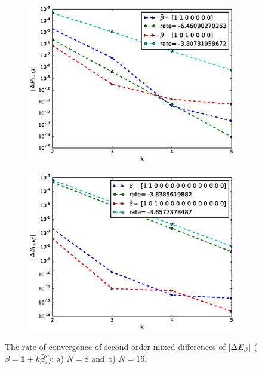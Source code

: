 \documentclass[11pt]{article}
\begin{document}
\begin{figure}[!h]
	\centering
	\begin{subfigure}{.5\textwidth}
		\centering
		\includegraphics[width=1\linewidth]{./figures/mixed_difference_order2_BS_richardson_4_8_no_midd_2le}
		\caption{}
		\label{fig:sub51_richardson}
	\end{subfigure}%
	\begin{subfigure}{.5\textwidth}
		\centering
		\includegraphics[width=1\linewidth]{./figures/mixed_difference_order2_BS_richardson_8_16_no_middle}
		\caption{}
		\label{fig:sub52_richardson}
	\end{subfigure}
	
	\caption{The rate of convergence of second order mixed differences of  $\left\lvert\Delta E_{\beta}\right\rvert$ ($\beta=\mathbf{1}+k \bar{\beta}$)): a) $N=8$ and b) $N=16$.}
	\label{fig:test5_richardson}
\end{figure}
\end{document}
